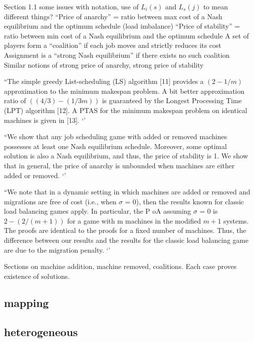 \documentclass{article}
\begin{document}
Section 1.1 some issues with notation, use of $L_i(s)$ and $L_s(j)$ to mean different things?
“Price of anarchy” = ratio between max cost of a Nash equilibrium and the optimum schedule (load imbalance)
“Price of stability” = ratio between min cost of a Nash equilibrium and the optimum schedule
A set of players form a “coalition” if each job moves and strictly reduces its cost
Assignment is a “strong Nash equilibrium” if there exists no such coalition
Similar notions of strong price of anarchy, strong price of stability

``The simple greedy List-scheduling (LS) algorithm [11] provides a $(2 - 1/m)$approximation to the minimum makespan problem. A bit better approximation ratio of  $((4/3) - (1/3m))$ is guaranteed by the Longest Processing Time (LPT) algorithm [12]. A PTAS for the minimum makespan problem on identical machines is given in [13]. ‘’

``We show that any job scheduling game with added or removed machines possesses at least one Nash equilibrium schedule. Moreover, some optimal solution is also a Nash equilibrium, and thus, the price of stability is 1. We show that in general, the price of anarchy is unbounded when machines are either added or removed. ‘’

``We note that in a dynamic setting in which machines are added or removed and migrations 
are free of cost (i.e., when $\sigma$ = 0), then the results known for classic load balancing games apply.   In particular, the P oA assuming $\sigma$ = 0 is $2 - (2 / (m+1))$ for a game with m machines in the modified $m+1$  systems. The proofs are identical to the proofs for a fixed number of machines. Thus, the difference between our results and the results for the classic load balancing game are due to the migration penalty. ‘’

Sections on machine addition, machine removed, coalitions.  Each case proves existence of solutions.






\subsection{mapping}

\cite{doi:10.1137/0611030}
\cite{4227986}
\cite{doi:10.1142/S0129054197000215}
\cite{Sbirlea:2014:BMS:2628071.2628090}

\subsection{heterogeneous}
\end{document}
